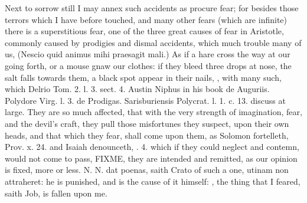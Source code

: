 {Next to sorrow still I may annex such accidents as procure fear; for
besides those terrors which I have before touched, and many other
fears (which are infinite) there is a superstitious fear, one of the
three great causes of fear in Aristotle, commonly caused by prodigies
and dismal accidents, which much trouble many of us, (Nescio quid
animus mihi praesagit mali.) As if a hare cross the way at our going
forth, or a mouse gnaw our clothes: if they bleed three drops at nose,
the salt falls towards them, a black spot appear in their nails, \etc{},
with many such, which Delrio Tom. 2. l. 3. sect. 4. Austin Niphus in
his book de Auguriis. Polydore Virg. l. 3. de Prodigas. Sarisburiensis
Polycrat. l. 1. c. 13. discuss at large. They are so much affected,
that with the very strength of imagination, fear, and the devil's
craft, they pull those misfortunes they suspect, upon their own
heads, and that which they fear, shall come upon them, as Solomon
fortelleth, Prov. x. 24. and Isaiah denounceth, . 4. which if
they could neglect and contemn, would not come to pass, FIXME, they are intended and remitted, as our opinion is fixed,
more or less. N. N. dat poenas, saith Crato of such a one, utinam
non attraheret: he is punished, and is the cause of it  himself:
, the thing that I feared,
saith Job, is fallen upon me.

}
